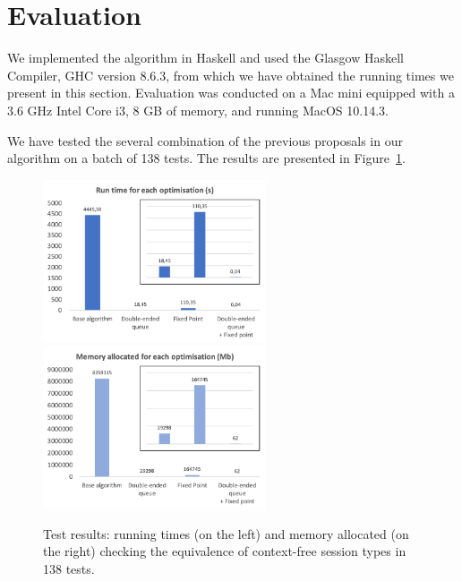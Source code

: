 \section{Evaluation}
\label{sec:evaluation}



We implemented the algorithm
in Haskell and used the Glasgow Haskell Compiler, GHC version 8.6.3,
from which we have obtained the running times we present in this
section.  Evaluation was conducted on a Mac mini equipped with a 3.6
GHz Intel Core i3, 8 GB of memory, and running MacOS 10.14.3.
%


We have tested the several combination of the previous proposals
in our algorithm on a batch of 138 tests. The results are presented 
in Figure~\ref{fig:results}.

\begin{figure}[h]
	\includegraphics[height=4.8cm]{img/run_time}	\qquad 
	\includegraphics[height=4.8cm]{img/memory_alloc}	
	\caption{Test results: running times (on the left) and
	memory allocated (on the right) checking the equivalence 
	of context-free session types in 138 tests.}
	\label{fig:results}
\end{figure}

